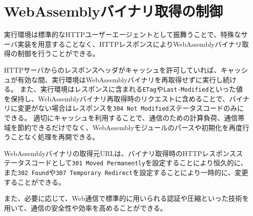 \section{WebAssemblyバイナリ取得の制御}

実行環境は標準的なHTTPユーザーエージェントとして振舞うことで、特殊なサーバ実装を用意することなく、HTTPレスポンスによりWebAssemblyバイナリ取得の制御を行うことができる。

HTTPサーバからのレスポンスヘッダがキャッシュを許可していれば、キャッシュが有効な間、実行環境はWebAssemblyバイナリを再取得せずに実行し続ける。
また、実行環境はレスポンスに含まれる{\tt ETag}や{\tt Last-Modified}といった値を保持し、WebAssemblyバイナリ再取得時のリクエストに含めることで、バイナリに変更がない場合はレスポンスを{\tt 304 Not Modified}ステータスコードのみにできる。
適切にキャッシュを利用することで、通信のための計算負荷、通信帯域を節約できるだけでなく、WebAssemblyモジュールのパースや初期化を再度行うことなく処理を再開できる。

WebAssemblyバイナリの取得元URLは、バイナリ取得時のHTTPレスポンスステータスコードとして{\tt 301 Moved Permanently}を設定することにより恒久的に、また{\tt 302 Found}や{\tt 307 Temporary Redirect}を設定することにより一時的に、変更することができる。

また、必要に応じて、Web通信で標準的に用いられる認証や圧縮といった技術を用いて、通信の安全性や効率を高めることができる。
